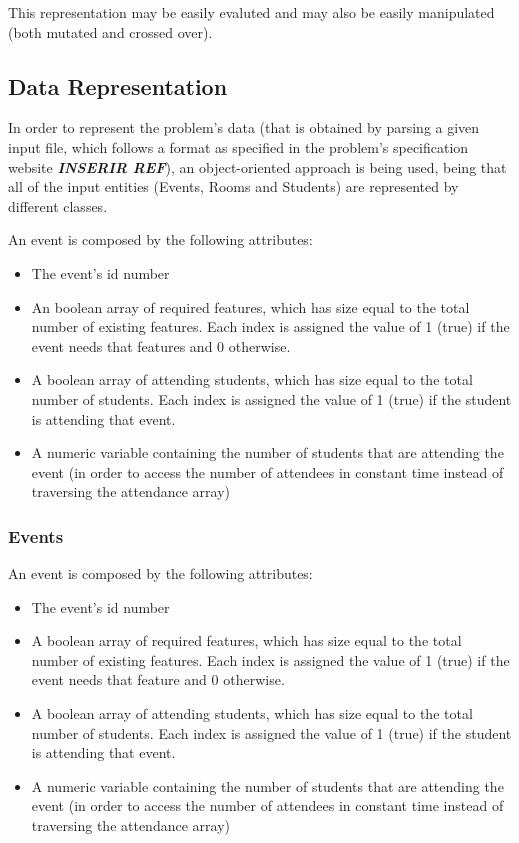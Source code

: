\documentclass[conference]{IEEEtran}
\begin{document}
This representation may be easily evaluted and may also be easily manipulated (both mutated and crossed over).

\subsection{Data Representation}

In order to represent the problem's data (that is obtained by parsing a given input file, which follows a format as specified in the problem's specification website \textbf{\textit{INSERIR REF}}), an object-oriented approach is being used, being that all of the input entities (Events, Rooms and Students) are represented by different classes.

An event is composed by the following attributes:
\begin{itemize}
    \item The event's id number
    \item An boolean array of required features, which has size equal to the total number of existing features. Each index is assigned the value of 1 (true) if the event needs that features and 0 otherwise.
    \item A boolean array of attending students, which has size equal to the total number of students. Each index is assigned the value of 1 (true) if the student is attending that event.
    \item A numeric variable containing the number of students that are attending the event (in order to access the number of attendees in constant time instead of traversing the attendance array)
\end{itemize}

\subsubsection{Events}

An event is composed by the following attributes:
\begin{itemize}
    \item The event's id number
    \item A boolean array of required features, which has size equal to the total number of existing features. Each index is assigned the value of 1 (true) if the event needs that feature and 0 otherwise.
    \item A boolean array of attending students, which has size equal to the total number of students. Each index is assigned the value of 1 (true) if the student is attending that event.
    \item A numeric variable containing the number of students that are attending the event (in order to access the number of attendees in constant time instead of traversing the attendance array)
\end{itemize}
\end{document}
